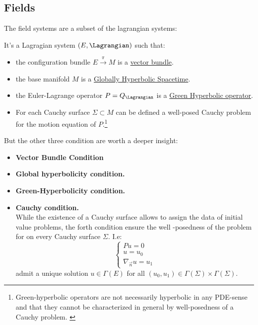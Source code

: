 \documentclass[Main]{subfiles}
\begin{document}
		\subsection{Fields}
			The field systems are a subset of the lagrangian systems:
			\begin{definition}
				It's a Lagragian system $(E,\Lagrangian)$ such that:
				\begin{itemize}
					\item the configuration bundle $E\xrightarrow{\pi} M$ is a \underline{vector bundle}.
					\item the base manifold $M$ is a \underline{Globally Hyperbolic Spacetime}.
					\item the Euler-Lagrange operator $P= Q_\Lagrangian$ is a \underline{Green Hyperbolic operator}.
					\item For each Cauchy surface $\Sigma \subset M$ can be defined a well-posed Cauchy problem for the motion equation of $P$.\footnote{Green-hyperbolic operators are not necessarily hyperbolic in any PDE-sense and that they cannot be characterized in general by well-posedness of a Cauchy problem. \cite{Terlaky2010} \cite{Bar2010}}
				\end{itemize}
			\end{definition}
		But the other three condition are worth a deeper insight:
		\begin{itemize}
			\item 	\textbf{Vector Bundle Condition}
			\item 	\textbf{Global hyperbolicity condition.}
			\item 	\textbf{Green-Hyperbolicity condition.}
			\item 	\textbf{Cauchy condition.}\\
					While the existence of a Cauchy surface allows to assign the data of initial value problems, the forth condition ensure the well -posedness of the problem for on every Cauchy surface $\Sigma$. I.e:
					\begin{equation}\label{CauchyProblem}
							\begin{cases} P u = 0 \\ u = u_0 \\ \nabla_{\vec{n}}u= u_1 \end{cases}
					\end{equation}
					admit a unique solution $u\in \Gamma(E)$ for all $(u_0, u_1) \in \Gamma (\Sigma )\times \Gamma (\Sigma )$.		
		\end{itemize}
\end{document}

